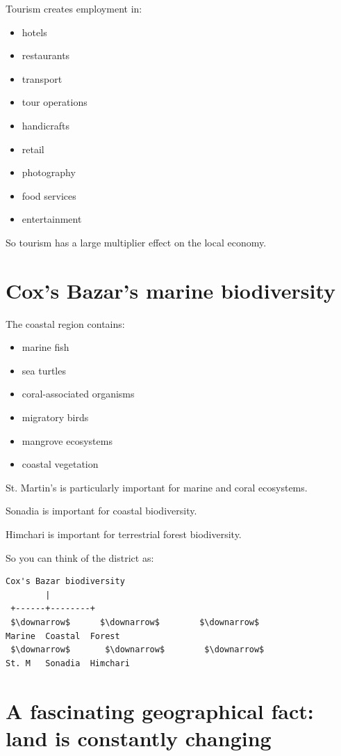 Tourism creates employment in:

\begin{itemize}
  \item hotels
  \item restaurants
  \item transport
  \item tour operations
  \item handicrafts
  \item retail
  \item photography
  \item food services
  \item entertainment
\end{itemize}

So tourism has a large multiplier effect on the local economy.

\medskip

\section{Cox's Bazar's marine biodiversity}

The coastal region contains:

\begin{itemize}
  \item marine fish
  \item sea turtles
  \item coral-associated organisms
  \item migratory birds
  \item mangrove ecosystems
  \item coastal vegetation
\end{itemize}

St. Martin's is particularly important for marine and coral ecosystems.

Sonadia is important for coastal biodiversity.

Himchari is important for terrestrial forest biodiversity.

So you can think of the district as:

\begin{lstlisting}
Cox's Bazar biodiversity
        |
 +------+--------+
 $\downarrow$      $\downarrow$        $\downarrow$
Marine  Coastal  Forest
 $\downarrow$       $\downarrow$        $\downarrow$
St. M   Sonadia  Himchari
\end{lstlisting}

\medskip

\section{A fascinating geographical fact: land is constantly changing}

